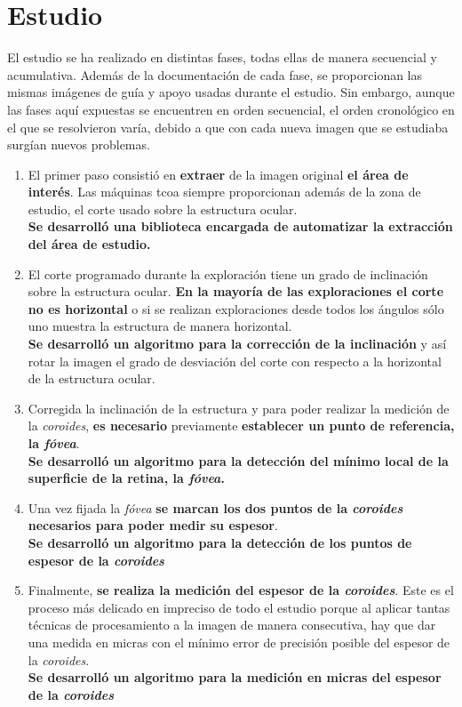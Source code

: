 \section{Estudio}
El estudio se ha realizado en distintas fases, todas ellas de manera
secuencial y acumulativa. Además de la documentación de cada fase, se
proporcionan las mismas imágenes de guía y apoyo usadas durante el
estudio.  Sin embargo, aunque las fases aquí expuestas se encuentren
en orden secuencial, el orden cronológico en el que se resolvieron
varía, debido a que con cada nueva imagen que se estudiaba surgían
nuevos problemas.
\begin{enumerate}
\item El primer paso consistió en \textbf{extraer} de la imagen
  original \textbf{el área de interés}. Las máquinas \gls{tcoa}
  siempre proporcionan además
  de la zona de estudio, el corte usado sobre la estructura ocular. \\
  \textbf{Se desarrolló una biblioteca encargada de automatizar la
    extracción del área de estudio.}
\item El corte programado durante la exploración tiene un grado de
  inclinación sobre la estructura ocular. \textbf{En la mayoría de las
    exploraciones el corte no es horizontal} o si se realizan
  exploraciones desde todos los ángulos sólo uno muestra la estructura
  de manera horizontal. \\
  \textbf{Se desarrolló un algoritmo para la corrección de la
    inclinación} y así rotar la imagen el grado de desviación del
  corte con respecto a la horizontal de la estructura ocular.
\item Corregida la inclinación de la estructura y para poder realizar
  la medición de la \emph{coroides}, \textbf{es necesario} previamente
  \textbf{establecer un punto de referencia, la \emph{fóvea}}. \\
  \textbf{Se desarrolló un algoritmo para la detección del mínimo
    local de la superficie de la retina, la \emph{fóvea}.}
\item Una vez fijada la \emph{fóvea} \textbf{se marcan los dos puntos
    de la \emph{coroides} necesarios para poder medir su espesor}. \\
  \textbf{Se desarrolló un algoritmo para la detección de los puntos
    de espesor de la \emph{coroides}}
\item Finalmente, \textbf{se realiza la medición del espesor de la
    \emph{coroides}}. Este es el proceso más delicado en impreciso de
  todo el estudio porque al aplicar tantas técnicas de procesamiento a
  la imagen de manera consecutiva, hay que dar una medida en micras
  con el mínimo error de precisión posible del espesor de la \emph{coroides}. \\
  \textbf{Se desarrolló un algoritmo para la medición en micras del
    espesor de la \emph{coroides}}
\end{enumerate}


